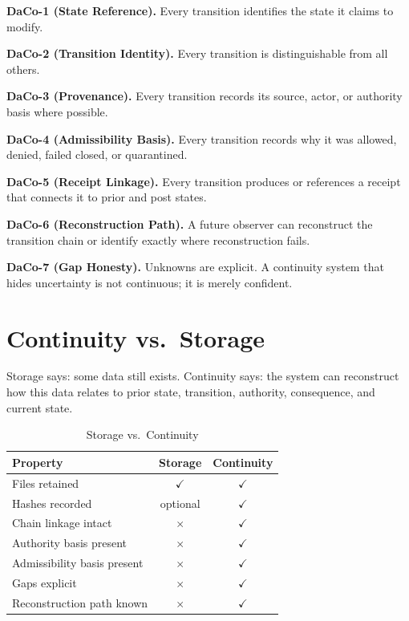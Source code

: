 \documentclass[letterpaper,10pt,conference]{ieeeconf}
\begin{document}
\textbf{DaCo-1 (State Reference).} Every transition identifies the state it claims to modify.

\textbf{DaCo-2 (Transition Identity).} Every transition is distinguishable from all others.

\textbf{DaCo-3 (Provenance).} Every transition records its source, actor, or authority basis where possible.

\textbf{DaCo-4 (Admissibility Basis).} Every transition records why it was allowed, denied, failed closed, or quarantined.

\textbf{DaCo-5 (Receipt Linkage).} Every transition produces or references a receipt that connects it to prior and post states.

\textbf{DaCo-6 (Reconstruction Path).} A future observer can reconstruct the transition chain or identify exactly where reconstruction fails.

\textbf{DaCo-7 (Gap Honesty).} Unknowns are explicit. A continuity system that hides uncertainty is not continuous; it is merely confident.

\section{Continuity vs.\ Storage}

Storage says: some data still exists.
Continuity says: the system can reconstruct how this data relates to prior state, transition, authority, consequence, and current state.

\begin{table}[h]
\centering
\caption{Storage vs.\ Continuity}
\begin{tabular}{lcc}
\toprule
Property & Storage & Continuity \\
\midrule
Files retained & $\checkmark$ & $\checkmark$ \\
Hashes recorded & optional & $\checkmark$ \\
Chain linkage intact & $\times$ & $\checkmark$ \\
Authority basis present & $\times$ & $\checkmark$ \\
Admissibility basis present & $\times$ & $\checkmark$ \\
Gaps explicit & $\times$ & $\checkmark$ \\
Reconstruction path known & $\times$ & $\checkmark$ \\
\bottomrule
\end{tabular}
\end{table}
\end{document}
